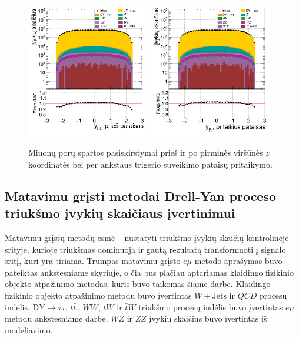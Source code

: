 \documentclass[a4paper, 12pt, oneside]{article}
\newcommand{\emu}{e\mu}
\newcommand{\WJets}{W\! +\!\mathrm{Jets}}
\newcommand{\DYtau}{\mathrm{DY} \! \rightarrow \! \tau\tau}
\newcommand{\QCD}{QC\! D}
\begin{document}
\begin{figure}[H]
	\includegraphics[width=0.48\textwidth]{Kursinis3/mumu_rapi_beforePVz.png}
	\includegraphics[width=0.48\textwidth]{Kursinis3/mumu_rapi_after.png}
	\caption{\label{fig:rapiba} Miuonų porų spartos pasiskirstymai prieš ir po pirminės viršūnės $z$ koordinatės bei per ankstaus
	trigerio suveikimo pataisų pritaikymo.}
\end{figure}

\subsection{Matavimu grįsti metodai Drell-Yan proceso triukšmo įvykių skaičiaus įvertinimui}
Matavimu grįstų metodų esmė -- nustatyti triukšmo įvykių skaičių kontrolinėje srityje, kurioje triukšmas dominuoja
ir gautą rezultatą transformuoti į signalo sritį, kuri yra tiriama.
Trumpas matavimu grįsto $\emu$ metodo aprašymas buvo pateiktas ankstesniame skyriuje, o čia bus plačiau aptariamas
klaidingo fizikinio objekto atpažinimo metodas, kuris buvo taikomas šiame darbe.
Klaidingo fizikinio objekto atpažinimo metodu buvo įvertintas $\WJets$ ir $\QCD$ procesų indėlis.
$\DYtau$, $t\bar{t}\,$, $WW$, $tW$ ir $\bar{t}W$ triukšmo procesų indėlis buvo įvertintas $\emu$ metodu ankstesniame darbe.
$WZ$ ir $ZZ$ įvykių skaičius buvo įvertintas iš modeliavimo.
\end{document}
